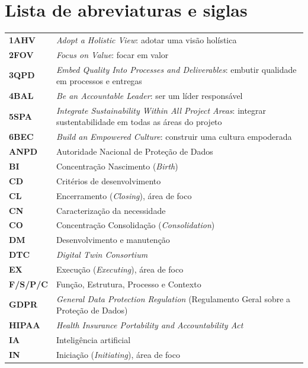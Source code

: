 \documentclass[11pt,a4paper]{article}
\begin{document}
\section*{Lista de abreviaturas e siglas}
\small
\begin{longtable}{@{}>{\raggedright\arraybackslash}p{2.6cm}>{\raggedright\arraybackslash}p{\dimexpr\linewidth-2.6cm-2\tabcolsep\relax}@{}}
\textbf{1AHV} & \textit{Adopt a Holistic View}: adotar uma visão holística\\[2pt]
\textbf{2FOV} & \textit{Focus on Value}: focar em valor\\[2pt]
\textbf{3QPD} & \textit{Embed Quality Into Processes and Deliverables}: embutir qualidade em processos e entregas\\[2pt]
\textbf{4BAL} & \textit{Be an Accountable Leader}: ser um líder responsável\\[2pt]
\textbf{5SPA} & \textit{Integrate Sustainability Within All Project Areas}: integrar sustentabilidade em todas as áreas do projeto\\[2pt]
\textbf{6BEC} & \textit{Build an Empowered Culture}: construir uma cultura empoderada\\[2pt]
\textbf{ANPD} & Autoridade Nacional de Proteção de Dados\\[2pt]
\textbf{BI} & Concentração Nascimento (\textit{Birth})\\[2pt]
\textbf{CD} & Critérios de desenvolvimento\\[2pt]
\textbf{CL} & Encerramento (\textit{Closing}), área de foco\\[2pt]
\textbf{CN} & Caracterização da necessidade\\[2pt]
\textbf{CO} & Concentração Consolidação (\textit{Consolidation})\\[2pt]
\textbf{DM} & Desenvolvimento e manutenção\\[2pt]
\textbf{DTC} & \textit{Digital Twin Consortium}\\[2pt]
\textbf{EX} & Execução (\textit{Executing}), área de foco\\[2pt]
\textbf{F/S/P/C} & Função, Estrutura, Processo e Contexto\\[2pt]
\textbf{GDPR} & \textit{General Data Protection Regulation} (Regulamento Geral sobre a Proteção de Dados)\\[2pt]
\textbf{HIPAA} & \textit{Health Insurance Portability and Accountability Act}\\[2pt]
\textbf{IA} & Inteligência artificial\\[2pt]
\textbf{IN} & Iniciação (\textit{Initiating}), área de foco\\[2pt]

\end{longtable}
\end{document}
